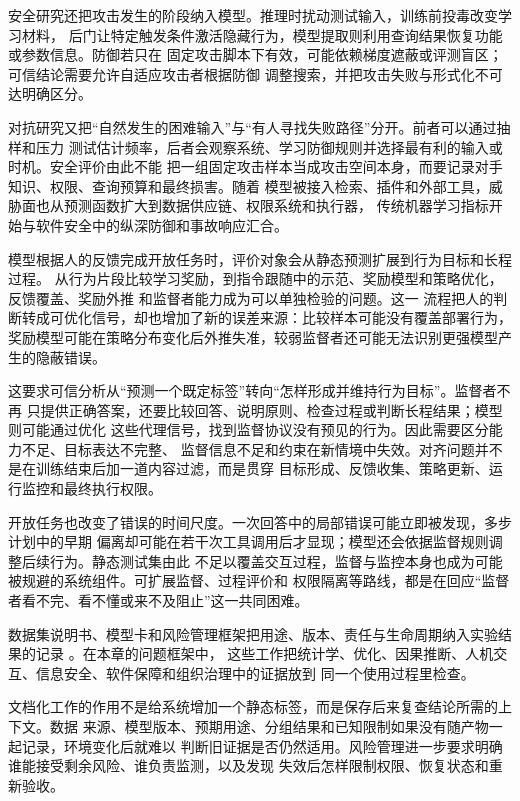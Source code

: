 安全研究还把攻击发生的阶段纳入模型。推理时扰动测试输入，训练前投毒改变学习材料，
后门让特定触发条件激活隐藏行为，模型提取则利用查询结果恢复功能或参数信息。防御若只在
固定攻击脚本下有效，可能依赖梯度遮蔽或评测盲区；可信结论需要允许自适应攻击者根据防御
调整搜索，并把攻击失败与形式化不可达明确区分。

对抗研究又把“自然发生的困难输入”与“有人寻找失败路径”分开。前者可以通过抽样和压力
测试估计频率，后者会观察系统、学习防御规则并选择最有利的输入或时机。安全评价由此不能
把一组固定攻击样本当成攻击空间本身，而要记录对手知识、权限、查询预算和最终损害。随着
模型被接入检索、插件和外部工具，威胁面也从预测函数扩大到数据供应链、权限系统和执行器，
传统机器学习指标开始与软件安全中的纵深防御和事故响应汇合。

模型根据人的反馈完成开放任务时，评价对象会从静态预测扩展到行为目标和长程过程。
从行为片段比较学习奖励，到指令跟随中的示范、奖励模型和策略优化，反馈覆盖、奖励外推
和监督者能力成为可以单独检验的问题。这一
流程把人的判断转成可优化信号，却也增加了新的误差来源：比较样本可能没有覆盖部署行为，
奖励模型可能在策略分布变化后外推失准，较弱监督者还可能无法识别更强模型产生的隐蔽错误。

这要求可信分析从“预测一个既定标签”转向“怎样形成并维持行为目标”。监督者不再
只提供正确答案，还要比较回答、说明原则、检查过程或判断长程结果；模型则可能通过优化
这些代理信号，找到监督协议没有预见的行为。因此需要区分能力不足、目标表达不完整、
监督信息不足和约束在新情境中失效。对齐问题并不是在训练结束后加一道内容过滤，而是贯穿
目标形成、反馈收集、策略更新、运行监控和最终执行权限。

开放任务也改变了错误的时间尺度。一次回答中的局部错误可能立即被发现，多步计划中的早期
偏离却可能在若干次工具调用后才显现；模型还会依据监督规则调整后续行为。静态测试集由此
不足以覆盖交互过程，监督与监控本身也成为可能被规避的系统组件。可扩展监督、过程评价和
权限隔离等路线，都是在回应“监督者看不完、看不懂或来不及阻止”这一共同困难。

数据集说明书、模型卡和风险管理框架把用途、版本、责任与生命周期纳入实验结果的记录
。在本章的问题框架中，
这些工作把统计学、优化、因果推断、人机交互、信息安全、软件保障和组织治理中的证据放到
同一个使用过程里检查。

文档化工作的作用不是给系统增加一个静态标签，而是保存后来复查结论所需的上下文。数据
来源、模型版本、预期用途、分组结果和已知限制如果没有随产物一起记录，环境变化后就难以
判断旧证据是否仍然适用。风险管理进一步要求明确谁能接受剩余风险、谁负责监测，以及发现
失效后怎样限制权限、恢复状态和重新验收。

